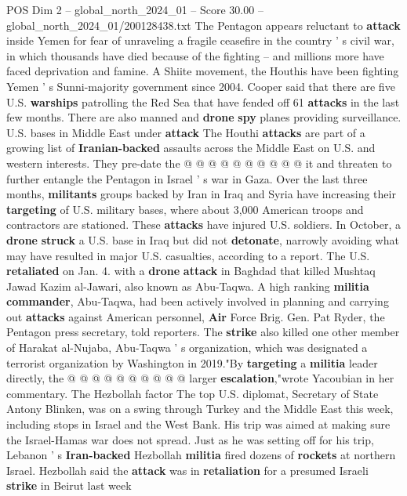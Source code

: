 \begin{textsample}{POS Dim 2 – global\_north\_2024\_01 – Score 30.00 – global\_north\_2024\_01/200128438.txt}
The Pentagon appears reluctant to \textbf{attack} inside Yemen for fear of unraveling a fragile ceasefire in the country ' s civil war, in which thousands have died because of the fighting -- and millions more have faced deprivation and famine.
A Shiite movement, the Houthis have been fighting Yemen ' s Sunni-majority government since 2004.
Cooper said that there are five U.S. \textbf{warships} patrolling the Red Sea that have fended off 61 \textbf{attacks} in the last few months.
There are also manned and \textbf{drone} \textbf{spy} planes providing surveillance.
U.S. bases in Middle East under \textbf{attack} The Houthi \textbf{attacks} are part of a growing list of \textbf{Iranian-backed} assaults across the Middle East on U.S. and western interests.
They pre-date the @ @ @ @ @ @ @ @ @ @ it and threaten to further entangle the Pentagon in Israel ' s war in Gaza.
Over the last three months, \textbf{militants} groups backed by Iran in Iraq and Syria have increasing their \textbf{targeting} of U.S. military bases, where about 3,000 American troops and contractors are stationed.
These \textbf{attacks} have injured U.S. soldiers.
In October, a \textbf{drone} \textbf{struck} a U.S. base in Iraq but did not \textbf{detonate}, narrowly avoiding what may have resulted in major U.S. casualties, according to a report.
The U.S. \textbf{retaliated} on Jan. 4. with a \textbf{drone} \textbf{attack} in Baghdad that killed Mushtaq Jawad Kazim al-Jawari, also known as Abu-Taqwa.
A high ranking \textbf{militia} \textbf{commander}, Abu-Taqwa, had been actively involved in planning and carrying out \textbf{attacks} against American personnel, \textbf{Air} Force Brig.
Gen.
Pat Ryder, the Pentagon press secretary, told reporters.
The \textbf{strike} also killed one other member of Harakat al-Nujaba, Abu-Taqwa ' s organization, which was designated a terrorist organization by Washington in 2019."By \textbf{targeting} a \textbf{militia} leader directly, the @ @ @ @ @ @ @ @ @ @ larger \textbf{escalation},"wrote Yacoubian in her commentary.
The Hezbollah factor The top U.S. diplomat, Secretary of State Antony Blinken, was on a swing through Turkey and the Middle East this week, including stops in Israel and the West Bank.
His trip was aimed at making sure the Israel-Hamas war does not spread.
Just as he was setting off for his trip, Lebanon ' s \textbf{Iran-backed} Hezbollah \textbf{militia} fired dozens of \textbf{rockets} at northern Israel.
Hezbollah said the \textbf{attack} was in \textbf{retaliation} for a presumed Israeli \textbf{strike} in Beirut last week

\end{textsample}
